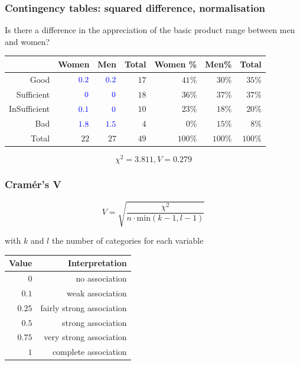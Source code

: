 \documentclass{beamer}
\begin{document}
\begin{frame}
  \frametitle{Contingency tables: squared difference, normalisation}
  Is there a difference in the appreciation of the basic product range between men and women?
  \begin{table}[h] \centering
    \begin{tabular}{@{}rrrrrrr@{}}
      \toprule
                   &                   Women &                     Men & Total & Women \% &   Men\% &   Total \\ \midrule
              Good & $\textcolor{blue}{0.2}$ & $\textcolor{blue}{0.2}$ &  $17$ &   $41$\% &  $30$\% &  $35$\% \\
        Sufficient &   $\textcolor{blue}{0}$ &   $\textcolor{blue}{0}$ &  $18$ &   $36$\% &  $37$\% &  $37$\% \\
      InSufficient & $\textcolor{blue}{0.1}$ &   $\textcolor{blue}{0}$ &  $10$ &   $23$\% &  $18$\% &  $20$\% \\
               Bad & $\textcolor{blue}{1.8}$ & $\textcolor{blue}{1.5}$ &   $4$ &    $0$\% &  $15$\% &   $8$\% \\
             Total &                    $22$ &                    $27$ &  $49$ &  $100$\% & $100$\% & $100$\% \\ \bottomrule
    \end{tabular}
  \end{table}
  \[ \chi^{2} = 3.811, V= 0.279 \]
\end{frame}

\begin{frame}
  \frametitle{Cramér's V}
  
  \[ V = \sqrt{\frac{\chi^2}{n \cdot \mathrm{min}(k - 1, l - 1)}} \]
  
  with $k$ and $l$ the number of categories for each variable
  
  \begin{table}[h] \centering
    \begin{tabular}{@{}rr@{}}
    	\toprule
    	 Value &            Interpretation \\ \midrule
    	   $0$ &            no association \\
    	 $0.1$ &          weak association \\
    	$0.25$ & fairly strong association \\
    	 $0.5$ &        strong association \\
    	$0.75$ &   very strong association \\
    	   $1$ &      complete association \\ \bottomrule
    \end{tabular}
  \end{table}
\end{frame}
\end{document}
